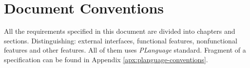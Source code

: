 \section{Document Conventions}
	\begin{comment}
		$<$Describe any standards or typographical conventions that were followed when 
		writing this SRS, such as fonts or highlighting that have special significance.  
		For example, state whether priorities  for higher-level requirements are assumed 
		to be inherited by detailed requirements, or whether every requirement statement 
		is to have its own priority.$>$
	\end{comment}
	All the requirements specified in this document are divided into chapters and sections. Distinguishing: external interfaces, functional features, nonfunctional features and other features. All of them uses \emph{PLanguage} standard. Fragment of a specification can be found in Appendix \ref{apx:planguage-conventions}.

